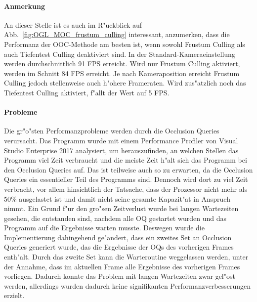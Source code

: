 \documentclass[journal]{vgtc}
\begin{document}
\paragraph{Anmerkung} An dieser Stelle ist es auch im R"uckblick auf Abb.\ \ref{fig:OGL_MOC_frustum_culling} interessant, anzumerken, dass die Performanz der OOC-Methode am besten ist, wenn sowohl Frustum Culling als auch Tiefentest Culling deaktiviert sind. In der Standard-Kameraeinstellung werden durchschnittlich 91 FPS erreicht. Wird nur Frustum Culling aktiviert, werden im Schnitt 84 FPS erreicht.
Je nach Kameraposition erreicht Frustum Culling jedoch stellenweise auch h"ohere Frameraten.
Wird zus"atzlich noch das Tiefentest Culling aktiviert, f"allt der Wert auf 5 FPS.\\

\paragraph{Probleme} Die gr"o"sten Performanzprobleme werden durch die Occlusion Queries verursacht.
Das Programm wurde mit einem Performance Profiler von Visual Studio Enterprise 2017 analysiert, um herauszufinden, an welchen Stellen das Programm viel Zeit verbraucht und die meiste Zeit h"alt sich das Programm bei den Occlusion Queries auf.
Das ist teilweise auch so zu erwarten, da die Occlusion Queries ein essentieller Teil des Programms sind. Dennoch wird dort zu viel Zeit verbracht, vor allem hinsichtlich der Tatsache, dass der Prozessor nicht mehr als 50\% ausgelastet ist und damit nicht seine gesamte Kapazit"at in Anspruch nimmt.
Ein Grund f"ur den gro"sen Zeitverlust wurde bei langen Wartezeiten gesehen, die entstanden sind, nachdem alle OQ gestartet wurden und das Programm auf die Ergebnisse warten musste.
Deswegen wurde die Implementierung dahingehend ge"andert, dass ein zweites Set an Occlusion Queries generiert wurde, das die Ergebnisse der OQs des vorherigen Frames enth"alt.
Durch das zweite Set kann die Warteroutine weggelassen werden, unter der Annahme, dass im aktuellen Frame alle Ergebnisse des vorherigen Frames vorliegen.
Dadurch konnte das Problem mit langen Wartezeiten zwar gel"ost werden, allerdings wurden dadurch keine signifikanten Performanzverbesserungen erzielt.
\end{document}

